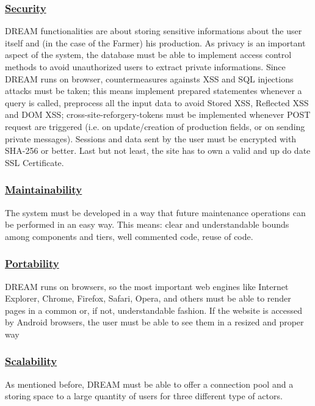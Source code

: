 		\subsubsection[Security]{\hyperlink{toc}{Security}}
		DREAM functionalities are about storing sensitive informations about the user itself and (in the case of the Farmer) his production. As privacy is an important aspect of the system, the database must be able to implement access control methods to avoid unauthorized users to extract private informations. Since DREAM runs on browser, countermeasures againsts XSS and SQL injections attacks must be taken; this means implement prepared statementes whenever a query is called, preprocess all the input data to avoid Stored XSS, Reflected XSS and DOM XSS; cross-site-reforgery-tokens must be implemented whenever POST request are triggered (i.e. on update/creation of production fields, or on sending private messages). Sessions and data sent by the user must be encrypted with SHA-256 or better. Last but not least, the site has to own a valid and up do date SSL Certificate.
		
		\subsubsection[Maintainability]{\hyperlink{toc}{Maintainability}}
		The system must be developed in a way that future maintenance operations can be performed in an easy way. This means: clear and understandable bounds among components and tiers, well commented code, reuse of code.
		\subsubsection[Portability]{\hyperlink{toc}{Portability}}
		DREAM runs on browsers, so the most important web engines like Internet Explorer, Chrome, Firefox, Safari, Opera, and others must be able to render pages in a common or, if not, understandable fashion. If the website is accessed by Android browsers, the user must be able to see them in a resized and proper way
		
		\subsubsection[Scalability]{\hyperlink{toc}{Scalability}}
		As mentioned before, DREAM must be able to offer a connection pool and a storing space to a large quantity of users for three different type of actors.
	
		\FloatBarrier
		\newpage